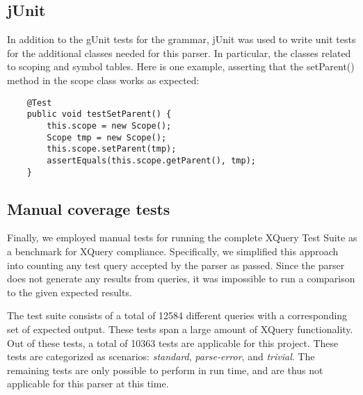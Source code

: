 \subsection{jUnit}
In addition to the gUnit tests for the grammar, jUnit was used to write unit tests for
the additional classes needed for this parser. In particular, the classes
related to scoping and symbol tables. Here is one example, asserting that the
setParent() method in the scope class works as expected:
\begin{verbatim}
    @Test
    public void testSetParent() {
        this.scope = new Scope();
        Scope tmp = new Scope();
        this.scope.setParent(tmp);
        assertEquals(this.scope.getParent(), tmp);
    }
\end{verbatim}

\subsection{Manual coverage tests}
Finally, we employed manual tests for running the complete XQuery Test Suite\cite{w3c05}
as a benchmark for XQuery compliance. Specifically, we simplified this approach
into counting any test query accepted by the parser as passed. Since the parser
does not generate any results from queries, it was impossible to run a
comparison to the given expected results.

The test suite consists of a total of 12584 different queries with a
corresponding set of expected output. These tests span a large amount of XQuery
functionality. Out of these tests, a total of 10363 tests are applicable for
this project. These tests are categorized as scenarios: \emph{standard}, 
\emph{parse-error}, and \emph{trivial}. The remaining tests are only possible to
perform in run time, and are thus not applicable for this parser at this time.
